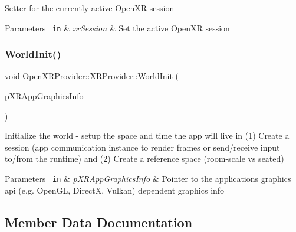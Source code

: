 Setter for the currently active Open\+XR session 
\begin{DoxyParams}[1]{Parameters}
\mbox{\texttt{ in}}  & {\em xr\+Session} & Set the active Open\+XR session \\
\hline
\end{DoxyParams}
\mbox{\label{class_open_x_r_provider_1_1_x_r_provider_a381bae7b1021638036878cad1c0ea3c2}} 
\subsubsection{\texorpdfstring{WorldInit()}{WorldInit()}}
{\footnotesize\ttfamily void Open\+X\+R\+Provider\+::\+X\+R\+Provider\+::\+World\+Init (\begin{DoxyParamCaption}\item[{\mbox{\hyperlink{struct_open_x_r_provider_1_1_x_r_app_graphics_info}{X\+R\+App\+Graphics\+Info}} $\ast$}]{p\+X\+R\+App\+Graphics\+Info }\end{DoxyParamCaption})\hspace{0.3cm}{\ttfamily [private]}}

Initialize the world -\/ setup the space and time the app will live in (1) Create a session (app communication instance to render frames or send/receive input to/from the runtime) and (2) Create a reference space (room-\/scale vs seated) 
\begin{DoxyParams}[1]{Parameters}
\mbox{\texttt{ in}}  & {\em p\+X\+R\+App\+Graphics\+Info} & Pointer to the application\textquotesingle{}s graphics api (e.\+g. Open\+GL, DirectX, Vulkan) dependent graphics info \\
\hline
\end{DoxyParams}


\subsection{Member Data Documentation}
\mbox{\label{class_open_x_r_provider_1_1_x_r_provider_ab5e48dc08aa6d7e3656ee9da55bcc076}} 
